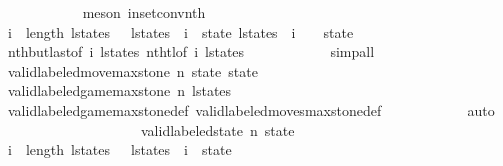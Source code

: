 \begin{isabellebody}
\ \ \ \ \ \ \ \ \ \ \isamarkupfalse%
\ {\isacharparenleft}meson\ in{\isacharunderscore}set{\isacharunderscore}conv{\isacharunderscore}nth{\isacharparenright}\isanewline
\ \ \ \ \ \ \ \ \isamarkupfalse%
\ {\isachardoublequoteopen}i\ {\isacharless}\ length\ l{\isacharunderscore}states\ {\isacharminus}\ {}{\isachardoublequoteclose}\ {\isachardoublequoteopen}l{\isacharunderscore}states\ {\isacharbang}\ i\ {\isacharequal}\ state{\isachardoublequoteclose}\ {\isachardoublequoteopen}l{\isacharunderscore}states\ {\isacharbang}\ {\isacharparenleft}i\ {\isacharplus}\ {}{\isacharparenright}\ {\isacharequal}\ state{\isacharprime}{\isachardoublequoteclose}\isanewline
\ \ \ \ \ \ \ \ \ \ \isamarkupfalse%
\ nth{\isacharunderscore}butlast{\isacharbrackleft}of\ i\ l{\isacharunderscore}states{\isacharbrackright}\ nth{\isacharunderscore}tl{\isacharbrackleft}of\ i\ l{\isacharunderscore}states{\isacharbrackright}\isanewline
\ \ \ \ \ \ \ \ \ \ \isamarkupfalse%
\ simp{\isacharunderscore}all\isanewline
\ \ \ \ \ \ \ \ \isamarkupfalse%
\ {\isachardoublequoteopen}valid{\isacharunderscore}labeled{\isacharunderscore}move{\isacharunderscore}max{\isacharunderscore}stone\ n\ state\ state{\isacharprime}{\isachardoublequoteclose}\isanewline
\ \ \ \ \ \ \ \ \ \ \isamarkupfalse%
\ {\isacharbackquoteopen}valid{\isacharunderscore}labeled{\isacharunderscore}game{\isacharunderscore}max{\isacharunderscore}stone\ n\ l{\isacharunderscore}states{\isacharbackquoteclose}\isanewline
\ \ \ \ \ \ \ \ \ \ \isamarkupfalse%
\ valid{\isacharunderscore}labeled{\isacharunderscore}game{\isacharunderscore}max{\isacharunderscore}stone{\isacharunderscore}def\ valid{\isacharunderscore}labeled{\isacharunderscore}moves{\isacharunderscore}max{\isacharunderscore}stone{\isacharunderscore}def\isanewline
\ \ \ \ \ \ \ \ \ \ \isamarkupfalse%
\ auto\isanewline
\ \ \ \ \ \ \ \ \isamarkupfalse%
\ \isanewline
\ \ \ \ \ \ \ \ \isamarkupfalse%
\ {\isachardoublequoteopen}valid{\isacharunderscore}labeled{\isacharunderscore}state\ n\ state{\isachardoublequoteclose}\isanewline
\ \ \ \ \ \ \ \ \ \ \isamarkupfalse%
\ {\isacharbackquoteopen}i\ {\isacharless}\ length\ l{\isacharunderscore}states\ {\isacharminus}\ {}{\isacharbackquoteclose}\ {\isacharbackquoteopen}l{\isacharunderscore}states\ {\isacharbang}\ i\ {\isacharequal}\ state{\isacharbackquoteclose}\isanewline
\ \ \ \ \ \ \ \ \ \ \isamarkupfalse%

\end{isabellebody}
